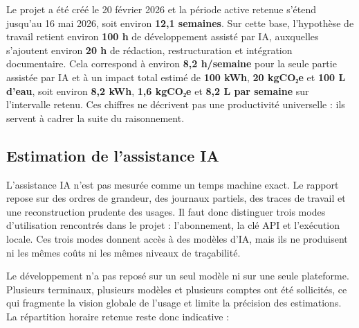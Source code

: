 \documentclass[
  10pt,
  a4paper,
  DIV=11,
  numbers=noendperiod,
  oneside]{scrreprt}
\let\oldtextbf\textbf
\renewcommand{\textbf}[1]{\oldtextbf{\textcolor{cmmnavy}{#1}}}
\begin{document}
Le projet a été créé le 20 février 2026 et la période active retenue
s'étend jusqu'au 16 mai 2026, soit environ \textbf{12,1 semaines}. Sur
cette base, l'hypothèse de travail retient environ \textbf{100 h} de
développement assisté par IA, auxquelles s'ajoutent environ \textbf{20
h} de rédaction, restructuration et intégration documentaire. Cela
correspond à environ \textbf{8,2 h/semaine} pour la seule partie
assistée par IA et à un impact total estimé de \textbf{100 kWh},
\textbf{20 kgCO₂e} et \textbf{100 L d'eau}, soit environ \textbf{8,2
kWh}, \textbf{1,6 kgCO₂e} et \textbf{8,2 L par semaine} sur l'intervalle
retenu. Ces chiffres ne décrivent pas une productivité universelle : ils
servent à cadrer la suite du raisonnement.

\subsection{Estimation de l'assistance
IA}\label{estimation-de-lassistance-ia}

L'assistance IA n'est pas mesurée comme un temps machine exact. Le
rapport repose sur des ordres de grandeur, des journaux partiels, des
traces de travail et une reconstruction prudente des usages. Il faut
donc distinguer trois modes d'utilisation rencontrés dans le projet :
l'abonnement, la clé API et l'exécution locale. Ces trois modes donnent
accès à des modèles d'IA, mais ils ne produisent ni les mêmes coûts ni
les mêmes niveaux de traçabilité.

Le développement n'a pas reposé sur un seul modèle ni sur une seule
plateforme. Plusieurs terminaux, plusieurs modèles et plusieurs comptes
ont été sollicités, ce qui fragmente la vision globale de l'usage et
limite la précision des estimations. La répartition horaire retenue
reste donc indicative :
\end{document}
